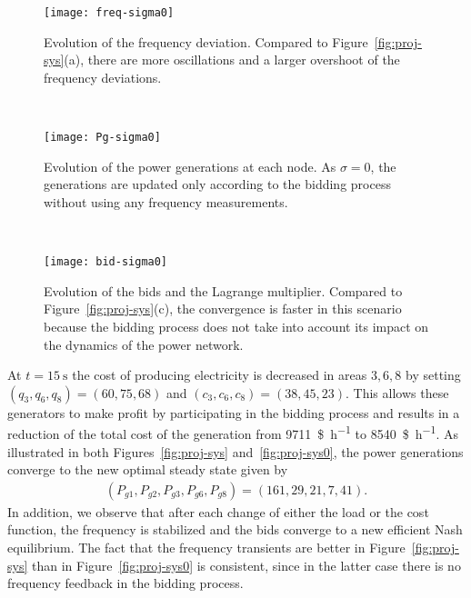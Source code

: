 \documentclass[journal]{IEEEtran}
\newcommand{\1}{\mathds 1}
\theoremstyle{remark}
\theoremstyle{definition}
\begin{document}
\begin{figure*}[tbh]
  \centering
  \begin{subfigure}[t]{0.3\textwidth}
    \texttt{[image: freq-sigma0]}
    \caption{Evolution of the frequency deviation. Compared to
      Figure~\ref{fig:proj-sys}(a), there are more oscillations and a
      larger overshoot of the frequency deviations. }
    \label{fig:freq0}
  \end{subfigure}
  ~ %
  \begin{subfigure}[t]{0.3\textwidth}
    \texttt{[image: Pg-sigma0]}
    \caption{Evolution of the power generations at each node. As $\sigma=0$, the generations are updated only according to the bidding process without using any frequency measurements. }
    \label{fig:Pg0}
  \end{subfigure}
  ~ %
  \begin{subfigure}[t]{0.3\textwidth}
    \texttt{[image: bid-sigma0]}
    \caption{Evolution of the bids and the Lagrange multiplier.
      Compared to Figure~\ref{fig:proj-sys}(c), the convergence is
      faster in this scenario because the bidding process does not
      take into account its impact on the dynamics of the power
      network.}
    \label{fig:bids0}
  \end{subfigure}
  \caption{Simulations of the interconnection~\eqref{eq:cl-sys}
    between the ISO-generation bidding mechanism and the power network
    dynamics for the case of $\sigma=0$, i.e., when there is no
    frequency feedback signal in the bidding process. The scenario is
    the same as in Figure \ref{fig:proj-sys}. As illustrated, the
    closed-loop system also converges in this case to an efficient
    equilibrium.}\label{fig:proj-sys0}
\end{figure*}

At $t=\SI{15}{\second}$ the cost of producing electricity is decreased
in areas $3,6,8$ by setting $(q_3,q_6,q_8)=(60,75,68)$ and
$(c_3,c_6,c_8)=(38,45,23)$. This allows these generators to make
profit by participating in the bidding process and results in a
reduction of the total cost of the generation from
\SI{9711}{\$\per\hour} to \SI{8540}{\$\per\hour}. As illustrated in
both Figures~\ref{fig:proj-sys} and~\ref{fig:proj-sys0}, the power
generations converge to the new optimal steady state given by
\begin{align*}
  (P_{g1},P_{g2},P_{g3},P_{g6},P_{g8})=(161, 29, 21, 7, 41).
\end{align*}
In addition, we observe that after each change of either the load or
the cost function, the frequency is stabilized and the bids converge
to a new efficient Nash equilibrium. The fact that the frequency
transients are better in Figure~\ref{fig:proj-sys} than in
Figure~\ref{fig:proj-sys0} is consistent, since in the latter case
there is no frequency feedback in the bidding process.
\end{document}
